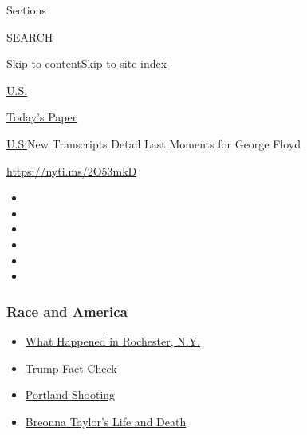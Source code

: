 Sections

SEARCH

\protect\hyperlink{site-content}{Skip to
content}\protect\hyperlink{site-index}{Skip to site index}

\href{https://www.nytimes3xbfgragh.onion/section/us}{U.S.}

\href{https://myaccount.nytimes3xbfgragh.onion/auth/login?response_type=cookie\&client_id=vi}{}

\href{https://www.nytimes3xbfgragh.onion/section/todayspaper}{Today's
Paper}

\href{/section/us}{U.S.}\textbar{}New Transcripts Detail Last Moments
for George Floyd

\url{https://nyti.ms/2O53mkD}

\begin{itemize}
\item
\item
\item
\item
\item
\item
\end{itemize}

\hypertarget{race-and-america}{%
\subsubsection{\texorpdfstring{\href{https://www.nytimes3xbfgragh.onion/news-event/george-floyd-protests-minneapolis-new-york-los-angeles?name=styln-george-floyd\&region=TOP_BANNER\&block=storyline_menu_recirc\&action=click\&pgtype=Article\&impression_id=1b049b60-f2c4-11ea-9ee4-4b0f9d7721fd\&variant=undefined}{Race
and America}}{Race and America}}\label{race-and-america}}

\begin{itemize}
\tightlist
\item
  \href{https://www.nytimes3xbfgragh.onion/2020/09/04/nyregion/rochester-police-daniel-prude.html?name=styln-george-floyd\&region=TOP_BANNER\&block=storyline_menu_recirc\&action=click\&pgtype=Article\&impression_id=1b049b61-f2c4-11ea-9ee4-4b0f9d7721fd\&variant=undefined}{What
  Happened in Rochester, N.Y.}
\item
  \href{https://www.nytimes3xbfgragh.onion/2020/09/01/us/politics/trump-fact-check-protests.html?name=styln-george-floyd\&region=TOP_BANNER\&block=storyline_menu_recirc\&action=click\&pgtype=Article\&impression_id=1b049b62-f2c4-11ea-9ee4-4b0f9d7721fd\&variant=undefined}{Trump
  Fact Check}
\item
  \href{https://www.nytimes3xbfgragh.onion/2020/08/30/us/portland-shooting-explained.html?name=styln-george-floyd\&region=TOP_BANNER\&block=storyline_menu_recirc\&action=click\&pgtype=Article\&impression_id=1b049b63-f2c4-11ea-9ee4-4b0f9d7721fd\&variant=undefined}{Portland
  Shooting}
\item
  \href{https://www.nytimes3xbfgragh.onion/2020/08/30/us/breonna-taylor-police-killing.html?name=styln-george-floyd\&region=TOP_BANNER\&block=storyline_menu_recirc\&action=click\&pgtype=Article\&impression_id=1b049b64-f2c4-11ea-9ee4-4b0f9d7721fd\&variant=undefined}{Breonna
  Taylor's Life and Death}
\end{itemize}

